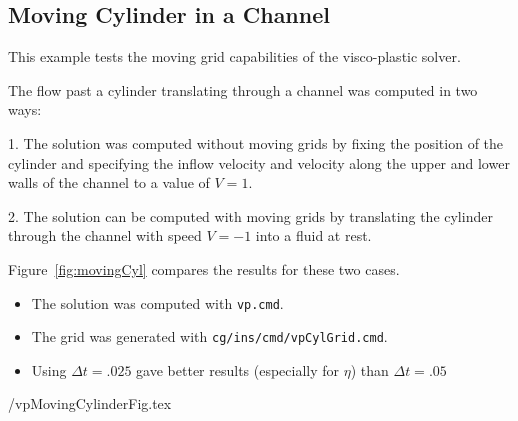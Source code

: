 \clearpage
\subsection{Moving Cylinder in a Channel}


This example tests the moving grid capabilities of the visco-plastic solver. 


The flow past a cylinder translating through a channel was computed in two ways:

1. The solution was computed without moving grids by fixing the position of the
cylinder and specifying the inflow velocity and velocity along the upper and
lower walls of the channel to a value of $V=1$.


2. The solution can be computed with moving grids by translating the cylinder 
through the channel with speed $V=-1$ into a fluid at rest.

Figure~\ref{fig:movingCyl} compares the results for these two cases. 






\begin{itemize}
\item The solution was computed with {\tt vp.cmd}. 
\item The grid was generated with {\tt cg/ins/cmd/vpCylGrid.cmd}.
\item Using $\Delta t=.025$ gave better results (especially for $\eta$) than $\Delta t=.05$
\end{itemize}

 \vpDir/vpMovingCylinderFig.tex

